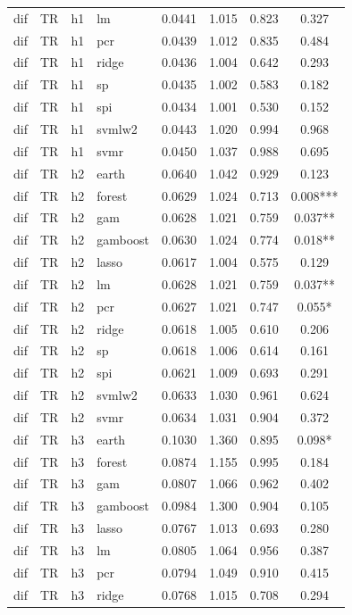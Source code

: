 \begin{ThreePartTable}
\begin{longtable}[t]{llclcccc}
dif & TR & h1 & lm & 0.0441 & 1.015 & 0.823 & 0.327\\
dif & TR & h1 & pcr & 0.0439 & 1.012 & 0.835 & 0.484\\
dif & TR & h1 & ridge & 0.0436 & 1.004 & 0.642 & 0.293\\
dif & TR & h1 & sp & 0.0435 & 1.002 & 0.583 & 0.182\\
dif & TR & h1 & spi & 0.0434 & 1.001 & 0.530 & 0.152\\
dif & TR & h1 & svmlw2 & 0.0443 & 1.020 & 0.994 & 0.968\\
dif & TR & h1 & svmr & 0.0450 & 1.037 & 0.988 & 0.695\\
\addlinespace
dif & TR & h2 & earth & 0.0640 & 1.042 & 0.929 & 0.123\\
dif & TR & h2 & forest & 0.0629 & 1.024 & 0.713 & 0.008***\\
dif & TR & h2 & gam & 0.0628 & 1.021 & 0.759 & 0.037**\\
dif & TR & h2 & gamboost & 0.0630 & 1.024 & 0.774 & 0.018**\\
dif & TR & h2 & lasso & 0.0617 & 1.004 & 0.575 & 0.129\\
dif & TR & h2 & lm & 0.0628 & 1.021 & 0.759 & 0.037**\\
dif & TR & h2 & pcr & 0.0627 & 1.021 & 0.747 & 0.055*\\
dif & TR & h2 & ridge & 0.0618 & 1.005 & 0.610 & 0.206\\
dif & TR & h2 & sp & 0.0618 & 1.006 & 0.614 & 0.161\\
dif & TR & h2 & spi & 0.0621 & 1.009 & 0.693 & 0.291\\
dif & TR & h2 & svmlw2 & 0.0633 & 1.030 & 0.961 & 0.624\\
dif & TR & h2 & svmr & 0.0634 & 1.031 & 0.904 & 0.372\\
\addlinespace
dif & TR & h3 & earth & 0.1030 & 1.360 & 0.895 & 0.098*\\
dif & TR & h3 & forest & 0.0874 & 1.155 & 0.995 & 0.184\\
dif & TR & h3 & gam & 0.0807 & 1.066 & 0.962 & 0.402\\
dif & TR & h3 & gamboost & 0.0984 & 1.300 & 0.904 & 0.105\\
dif & TR & h3 & lasso & 0.0767 & 1.013 & 0.693 & 0.280\\
dif & TR & h3 & lm & 0.0805 & 1.064 & 0.956 & 0.387\\
dif & TR & h3 & pcr & 0.0794 & 1.049 & 0.910 & 0.415\\
dif & TR & h3 & ridge & 0.0768 & 1.015 & 0.708 & 0.294\\

\end{longtable}
\end{ThreePartTable}
